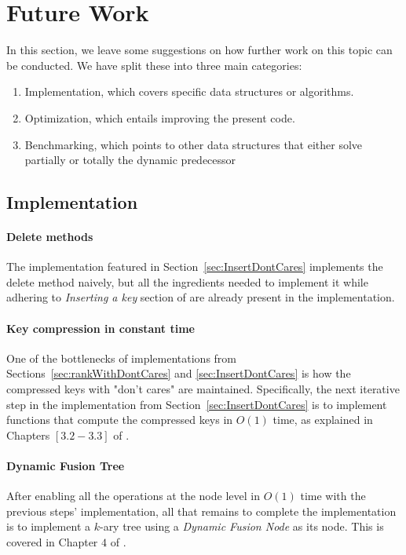 \section{Future Work} \label{sec:futureWork}
In this section, we leave some suggestions on how further work on this topic can be conducted. We have split these into three main categories:
\begin{enumerate}
    \item
    Implementation, which covers specific data structures or algorithms.
    
    \item
    Optimization, which entails improving the present code.
    
    \item
    Benchmarking, which points to other data structures that either solve partially or totally the dynamic predecessor 
    
\end{enumerate}

\subsection{Implementation} \label{sec:FutureWorkImplementation}

\paragraph*{Delete methods}
The implementation featured in Section~\ref{sec:InsertDontCares} implements the {\ttfamily delete} method naively, but all the ingredients needed to implement it while adhering to \textit{Inserting a key} section of \cite{patrascu2014dynamic} are already present in the implementation.

\paragraph*{Key compression in constant time}
One of the bottlenecks of implementations from Sections~\ref{sec:rankWithDontCares} and \ref{sec:InsertDontCares} is how the compressed keys with "don't cares" are maintained. Specifically, the next iterative step in the implementation from Section~\ref{sec:InsertDontCares} is to implement functions that compute the compressed keys in $O(1)$ time, as explained in Chapters $[3.2 - 3.3]$ of \cite{patrascu2014dynamic}.

\paragraph*{Dynamic Fusion Tree}
After enabling all the operations at the node level in $O(1)$ time with the previous steps' implementation, all that remains to complete the implementation is to implement a $k$-ary tree using a \textit{Dynamic Fusion Node} as its node. This is covered in Chapter $4$ of \cite{patrascu2014dynamic}.

